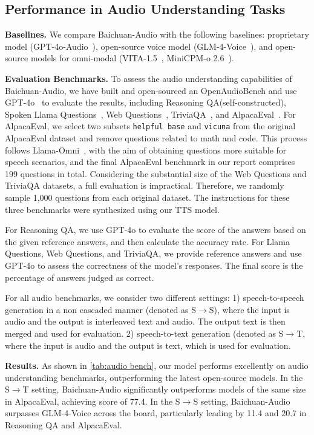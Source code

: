 \subsection{Performance in Audio Understanding Tasks}

\textbf{Baselines.} We compare Baichuan-Audio with the following baselines: proprietary model (GPT-4o-Audio~\cite{HelloGPT4o}), open-source voice model (GLM-4-Voice~\cite{zeng2024glm}), and open-source models for omni-modal (VITA-1.5~\cite{fu2025vita}, MiniCPM-o 2.6~\cite{yao2024minicpm}).

\textbf{Evaluation Benchmarks.} To assess the audio understanding capabilities of Baichuan-Audio, we have built and open-sourced an OpenAudioBench and use GPT-4o~\cite{HelloGPT4o} to evaluate the results, including Reasoning QA(self-constructed), Spoken Llama Questions~\cite{nachmani2023spoken}, Web Questions~\cite{berant2013semantic}, TriviaQA~\cite{joshi2017triviaqa}, and AlpacaEval~\cite{li2023alpacaeval}. For AlpacaEval, we select two subsets \texttt{helpful base} and \texttt{vicuna} from the original AlpacaEval dataset and remove questions related to math and code. This process follows Llama-Omni~\cite{fang2024llama}, with the aim of obtaining questions more suitable for speech scenarios, and the final AlpacaEval benchmark in our report comprises 199 questions in total. Considering the substantial size of the Web Questions and TriviaQA datasets, a full evaluation is impractical. Therefore, we randomly sample 1,000 questions from each original dataset. The instructions for these three benchmarks were synthesized using our TTS model.

For Reasoning QA, we use GPT-4o to evaluate the score of the answers based on the given reference answers, and then calculate the accuracy rate. For Llama Questions, Web Questions, and TriviaQA, we provide reference answers and use GPT-4o to assess the correctness of the model's responses. The final score is the percentage of answers judged as correct.

For all audio benchmarks, we consider two different settings: 1) speech-to-speech generation in a non cascaded manner (denoted as S$\to$S), where the input is audio and the output is interleaved text and audio. The output text is then merged and used for evaluation. 2) speech-to-text generation (denoted as S$\to$T, where the input is audio and the output is text, which is used for evaluation.

\textbf{Results.} As shown in \autoref{tab:audio bench}, our model performs excellently on audio understanding benchmarks, outperforming the latest open-source models. In the S$\to$T setting, Baichuan-Audio significantly outperforms models of the same size in AlpacaEval, achieving score of 77.4. In the S$\to$S setting, Baichuan-Audio surpasses GLM-4-Voice across the board, particularly leading by 11.4 and 20.7 in Reasoning QA and AlpacaEval.


